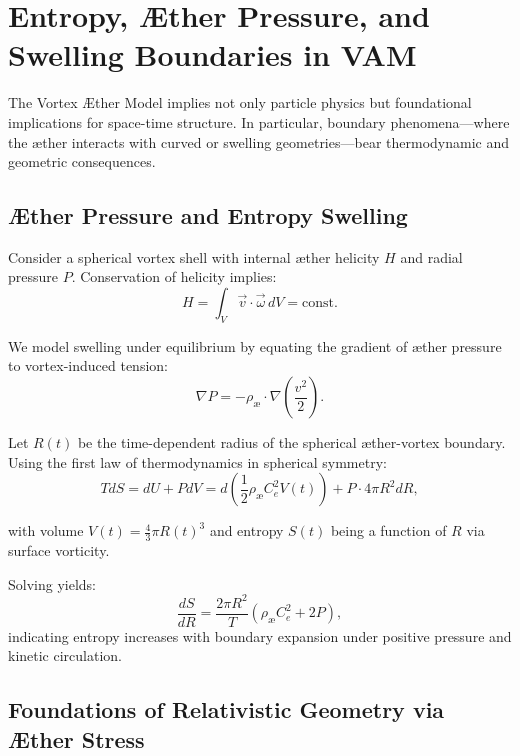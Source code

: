 \section{Entropy, Æther Pressure, and Swelling Boundaries in VAM}

The Vortex Æther Model implies not only particle physics but foundational implications for space-time structure. In particular, boundary phenomena—where the æther interacts with curved or swelling geometries—bear thermodynamic and geometric consequences.

\subsection{Æther Pressure and Entropy Swelling}

Consider a spherical vortex shell with internal æther helicity $H$ and radial pressure $P$. Conservation of helicity implies:
\begin{equation}
    H = \int_V \vec{v} \cdot \vec{\omega} \, dV = \text{const.}
\end{equation}

We model swelling under equilibrium by equating the gradient of æther pressure to vortex-induced tension:
\begin{equation}
    \nabla P = -\rho_{\text{\ae}} \cdot \nabla \left(\frac{v^2}{2}\right).
\end{equation}

Let $R(t)$ be the time-dependent radius of the spherical æther-vortex boundary. Using the first law of thermodynamics in spherical symmetry:
\begin{equation}
    TdS = dU + PdV = d\left(\frac{1}{2} \rho_{\text{\ae}} C_e^2 V(t)\right) + P \cdot 4\pi R^2 dR,
\end{equation}

with volume $V(t) = \frac{4}{3}\pi R(t)^3$ and entropy $S(t)$ being a function of $R$ via surface vorticity.

Solving yields:
\begin{equation}
    \frac{dS}{dR} = \frac{2\pi R^2}{T} \left( \rho_{\text{\ae}} C_e^2 + 2P \right),
\end{equation}
indicating entropy increases with boundary expansion under positive pressure and kinetic circulation.

\subsection{Foundations of Relativistic Geometry via Æther Stress}

